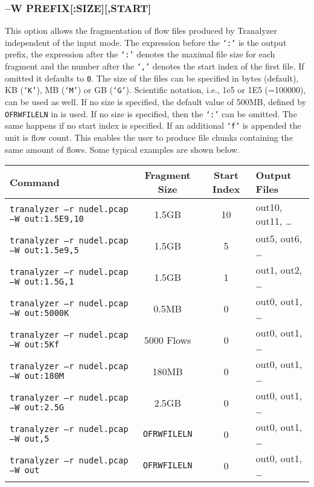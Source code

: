 \subsubsection{--W PREFIX[:SIZE][,START]}
This option allows the fragmentation of flow files produced by Tranalyzer independent of the input mode. The expression before the {\tt `:'} is the output prefix, the expression after the {\tt `:'} denotes the maximal file size for each fragment and the number after the {\tt `,'} denotes the start index of the first file. If omitted it defaults to {\tt 0}. The size of the files can be specified in bytes (default), KB ({\tt `K'}), MB ({\tt `M'}) or GB ({\tt `G'}). Scientific notation, i.e., 1e5 or 1E5 (=100000), can be used as well. If no size is specified, the default value of 500MB, defined by {\tt OFRWFILELN} in  is used. If no size is specified, then the {\tt `:'} can be omitted. The same happens if no start index is specified. If an additional {\tt `f'} is appended the unit is flow count. This enables the user to produce file chunks containing the same amount of flows. Some typical examples are shown below.

\begin{longtable}{lccl}
    \toprule
    {\bf Command} & {\bf Fragment Size} & {\bf Start Index} & {\bf Output Files}\\
    \midrule\endhead%
    {\tt tranalyzer --r nudel.pcap --W out:1.5E9,10} & 1.5GB            & 10 & out10, out11, \ldots\\
    {\tt tranalyzer --r nudel.pcap --W out:1.5e9,5}  & 1.5GB            &  5 & out5, out6, \ldots\\
    {\tt tranalyzer --r nudel.pcap --W out:1.5G,1}   & 1.5GB            &  1 & out1, out2, \ldots\\
    {\tt tranalyzer --r nudel.pcap --W out:5000K}    & 0.5MB            &  0 & out0, out1, \ldots\\
    {\tt tranalyzer --r nudel.pcap --W out:5Kf}      & 5000 Flows       &  0 & out0, out1, \ldots\\
    {\tt tranalyzer --r nudel.pcap --W out:180M}     & 180MB            &  0 & out0, out1, \ldots\\
    {\tt tranalyzer --r nudel.pcap --W out:2.5G}     & 2.5GB            &  0 & out0, out1, \ldots\\
    {\tt tranalyzer --r nudel.pcap --W out,5}        & {\tt OFRWFILELN} &  0 & out0, out1, \ldots\\
    {\tt tranalyzer --r nudel.pcap --W out}          & {\tt OFRWFILELN} &  0 & out0, out1, \ldots\\
    \bottomrule
\end{longtable}

